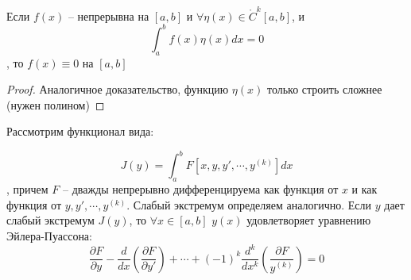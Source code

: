 \documentclass[document.tex]{subfiles}
\begin{document}
\begin{lemma}
    Если $f(x)$ -- непрерывна на $[a, b]$ и $\forall \eta(x) \in \mathring{C}^k[a, b]$, и
    \[
        \int_{a}^{b}f(x) \eta(x) dx = 0
    \], то $f(x) \equiv 0$ на $[a, b]$
\end{lemma}

\begin{proof}
    Аналогичное доказательство, функцию $\eta(x)$ только строить сложнее (нужен полином)
\end{proof}

Рассмотрим функционал вида:

\begin{equation}
    \label{kof}
    J(y) = \int_{a}^{b}F[x, y, y', \cdots, y^{(k)}]dx
\end{equation}, причем $F$ -- дважды непрерывно дифференцируема как функция от $x$ и как функция от $y, y', \cdots,
y^{(k)}$. Слабый экстремум определяем аналогично. Если $y$ дает слабый экстремум $J(y)$, то $\forall x \in [a, b]$
$y(x)$ удовлетворяет уравнению Эйлера-Пуассона:
\[
    \frac{\partial F}{\partial y} - \frac{d}{dx} \left( \frac{\partial F}{\partial y'} \right) + \cdots + (-1)^k
    \frac{d^k}{dx^k} \left( \frac{\partial F}{y^{(k)}} \right) = 0
\]
\end{document}
